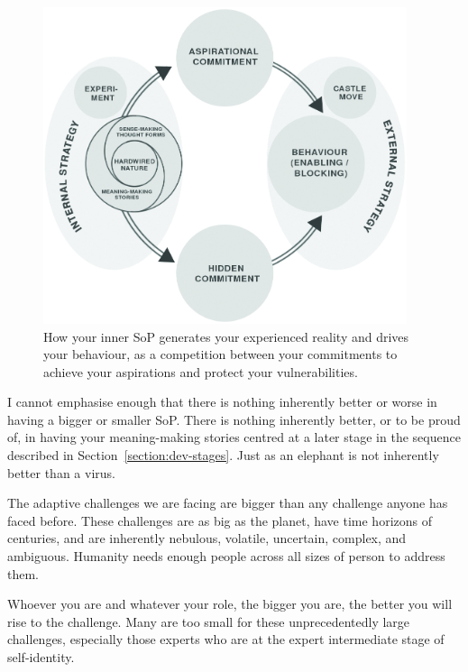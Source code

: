 \begin{figure}
\centering
    \includegraphics[width=0.95\textwidth]{./Images/Ground-pattern}
    \caption[How your sense-, meaning-making, and your nature drives your behaviours.]{How your inner SoP generates your experienced reality and drives your behaviour, as a competition between your commitments to achieve your aspirations and protect your vulnerabilities.}
    \label{fig:ground-pattern}
\end{figure}




I cannot emphasise enough that there is nothing inherently better or worse in having a bigger or smaller SoP. There is nothing inherently better, or to be proud of, in having your meaning\hyp{}making stories centred at a later stage in the sequence described in Section~\ref{section:dev-stages}. Just as an elephant is not inherently better than a virus.


The adaptive challenges we are facing are bigger than any challenge anyone has faced before. These challenges are as big as the planet, have time horizons of centuries, and are inherently nebulous, volatile, uncertain, complex, and ambiguous. Humanity needs enough people across all sizes of person to address them. 


Whoever you are and whatever your role, the bigger you are, the better you will rise to the challenge. Many are too small for these unprecedentedly large challenges, especially those experts who are at the expert intermediate stage of self-identity. 



